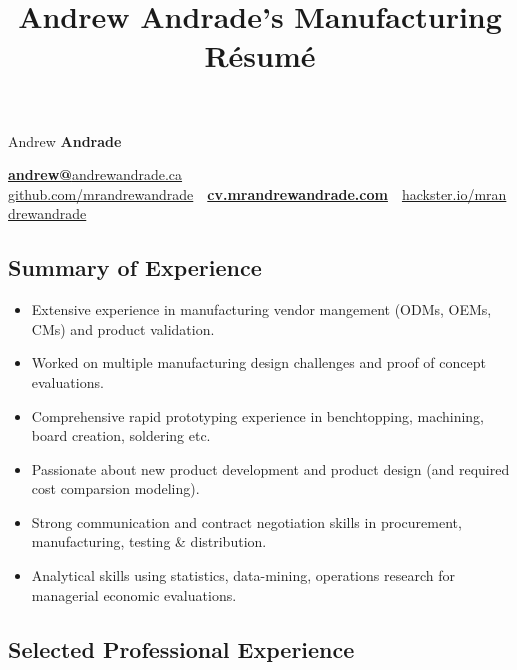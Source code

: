 \documentclass[pdftex,11pt,letterpaper]{article}
\title{Andrew Andrade's Manufacturing Résumé}
\begin{document}
\font

\begin{center}
  {\Huge Andrew \textbf{Andrade}}

  {\large
    \href{mailto:andrew@andrewandrade.ca}{\textbf{andrew@}}\href{http://andrewandrade.ca}{andrewandrade.ca} \\ 

    \href{https://github.com/mrandrewandrade}{github.com/mrandrewandrade}\ \textperiodcentered \ \href{http://cv.mrandrewandrade.com}{\textbf{cv.mrandrewandrade.com}}\ \textperiodcentered \ \href{https://www.hackster.io/mrandrewandrade}{hackster.io/mrandrewandrade}
  }
\end{center}

\subsection*{Summary of Experience}

\begin{itemize}[before=,after=]

\item Extensive experience in manufacturing vendor mangement (ODMs, OEMs, CMs) and product validation.
  
\item Worked on multiple manufacturing design challenges and proof of concept evaluations.

\item Comprehensive rapid prototyping experience in benchtopping, machining, board creation, soldering etc.

\item Passionate about new product development and product design (and required cost comparsion modeling).

\item Strong communication and contract negotiation skills in procurement, manufacturing, testing \& distribution.

\item Analytical skills using statistics, data-mining, operations research for managerial economic evaluations.

\end{itemize}

\subsection*{Selected Professional Experience}
\end{document}
